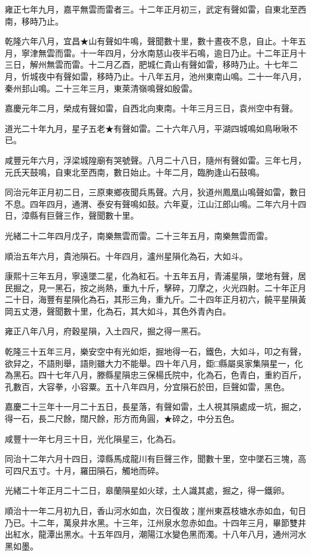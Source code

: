 \begin{pinyinscope}
雍正七年九月，嘉平無雲而雷者三。十二年正月初三，武定有聲如雷，自東北至西南，移時乃止。

乾隆六年八月，宜昌★山有聲如牛鳴，聲聞數十里，數十晝夜不息，自止。十年五月，寧津無雲而雷。十一年四月，分水南慈山夜半石鳴，逾日乃止。十二年正月十三日，解州無雲而雷。十二月乙酉，肥城仁貴山有聲如雷，移時乃止。十七年二月，忻城夜中有聲如雷，移時乃止。十八年五月，池州東南山鳴。二十一年八月，秦州邽山鳴。二十三年三月，東萊清嶺鳴聲如殷雷。

嘉慶元年二月，榮成有聲如雷，自西北向東南。十年三月三日，袁州空中有聲。

道光二十年九月，星子五老★有聲如雷。二十六年八月，平湖四城鳴如鳥啾啾不已。

咸豐元年六月，浮梁城隍廟有哭號聲。八月二十八日，隨州有聲如雷。三年七月，元氏天鼓鳴，自東北至西南，數日始止。十年二月，臨朐逢山石鼓鳴。

同治元年正月初二日，三原東鄉夜聞兵馬聲。六月，狄道州鳳凰山鳴聲如雷，數日不息。四年四月，通渭、泰安有聲鳴如鼓。六年夏，江山江郎山鳴。二年六月十四日，漳縣有巨聲三作，聲聞數十里。

光緒二十二年四月戊子，南樂無雲而雷。二十三年五月，南樂無雲而雷。

順治五年六月，貴池隕石。十年四月，瀘州星隕化為石，大如斗。

康熙十三年五月，寧遠墜二星，化為紅石。十五年五月，青浦星隕，墜地有聲，居民掘之，見一黑石，按之尚熱，重九十斤，擊碎，刀摩之，火光四射。二十年正月二十日，海豐有星隕化為石，其形三角，重九斤。二十四年正月初六，饒平星隕黃岡五丈港，聲聞數十里，化為石，其大如斗，其色外青內白。

雍正八年八月，府穀星隕，入土四尺，掘之得一黑石。

乾隆三十五年三月，樂安空中有光如炬，掘地得一石，鐵色，大如斗，叩之有聲，欲舁之，不語則舉，語則雖大力不能舉。四十年八月，鉅□縣屬吳家集隕星一，化為黑石。四十七年八月，滕縣星隕忠三保楊氏院中，化為石，色青白，重約百斤，孔數百，大容拳，小容粟。五十八年四月，分宜隕石於田，巨聲如雷，黑色。

嘉慶二十三年十一月二十五日，長星落，有聲如雷，土人視其隕處成一坑，掘之，得一石，長二尺餘，闊尺餘，形方而角圓，★碎之，中分五色。

咸豐十一年七月三十日，光化隕星三，化為石。

同治十二年六月十四日，漳縣馬成龍川有巨聲三作，聞數十里，空中墜石三塊，高可四尺五寸。十月，羅田隕石，觸地而碎。

光緒二十年正月二十二日，皋蘭隕星如火球，土人識其處，掘之，得一鐵卵。

順治十一年二月初九日，香山河水如血，次日復故；崖州東荔枝塘水赤如血，旬日乃已。十二年，萬泉井水黑。十三年，江州泉水忽赤如血。十四年三月，畢節雙井出紅水，龍潭出黑水。十五年四月，潮陽江水變色黑而濁。十八年八月，通州河水黑如墨。


\end{pinyinscope}
